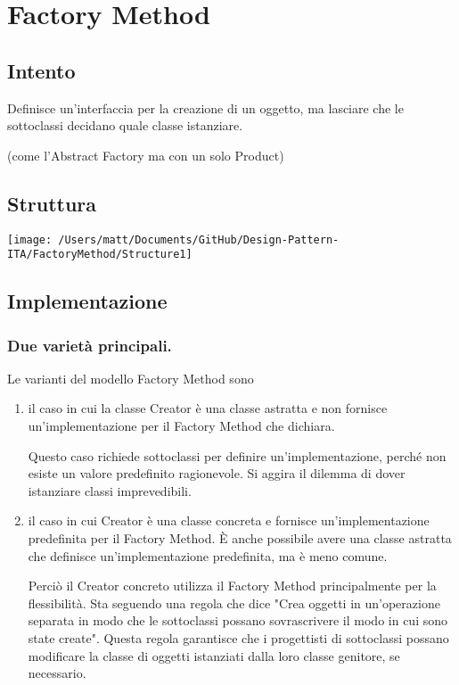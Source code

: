 \chapter{Factory Method}
\section{Intento}

Definisce un'interfaccia per la creazione di un oggetto, ma lasciare che le sottoclassi decidano quale classe istanziare.

(come l'Abstract Factory ma con un solo Product)


\section{Struttura}

\texttt{[image: /Users/matt/Documents/GitHub/Design-Pattern-ITA/FactoryMethod/Structure1]}


\section{Implementazione}

\subsection{Due varietà principali.}
Le varianti del modello Factory Method sono

\begin{enumerate}
    \item il caso in cui la classe Creator è una classe astratta e non fornisce un'implementazione per il Factory Method che dichiara.

    Questo caso richiede sottoclassi per definire un'implementazione, perché non esiste un valore predefinito ragionevole. Si aggira il dilemma di dover istanziare classi imprevedibili.

    \item il caso in cui Creator è una classe concreta e fornisce un'implementazione predefinita per il Factory Method. È anche possibile avere una classe astratta che definisce un'implementazione predefinita, ma è meno comune.

    Perciò il Creator concreto utilizza il Factory Method principalmente per la flessibilità. Sta seguendo una regola che dice "Crea oggetti in un'operazione separata in modo che le sottoclassi possano sovrascrivere il modo in cui sono state create". Questa regola garantisce che i progettisti di sottoclassi possano modificare la classe di oggetti istanziati dalla loro classe genitore, se necessario.

\end{enumerate}

